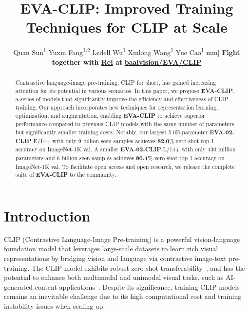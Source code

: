 \documentclass[10pt,twocolumn,letterpaper]{article}
\newcommand{\evablue}[1]{\textcolor{00blue!80}{#1}}
\newcommand{\evaclip}{{\textbf{\evablue{EVA-CLIP}}}\xspace}
\newcommand{\evaTwoclip}{{\textbf{\evablue{EVA-02-CLIP}}}\xspace}
\newcommand{\authorskip}{\hspace{4mm}}
\begin{document}
\title{\evaclip: Improved Training Techniques for CLIP at Scale}


\author{
{
Quan Sun\textsuperscript{1} \authorskip
Yuxin Fang\textsuperscript{1,2} \authorskip 
Ledell Wu\textsuperscript{1} \authorskip
Xinlong Wang\textsuperscript{1} \authorskip 
Yue Cao\textsuperscript{1}
}
\1mm]
{
\fontsize{8.4pt}{9.84pt}\selectfont
\textbf{Fight together with \href{https://en.wikipedia.org/wiki/Rei_Ayanami}{\color{00blue!80}Rei} at }\href{https://github.com/baaivision/EVA/tree/master/EVA-CLIP}{\color{00blue!80} \bfseries \ttfamily baaivision/EVA/CLIP}
}
}

\maketitle




\begin{abstract}
   Contrastive language-image pre-training, CLIP for short, has gained increasing attention for its potential in various scenarios. In this paper, we propose \evaclip, a series of models that significantly improve the efficiency and effectiveness of CLIP training. Our approach incorporates new techniques for representation learning, optimization, and augmentation, enabling \evaclip to achieve superior performance compared to previous CLIP models with the same number of parameters but significantly smaller training costs. Notably, our largest 5.0B-parameter \evaTwoclip-E/14+ with only 9 billion seen samples achieves \textbf{82.0}\% zero-shot top-1 accuracy on ImageNet-1K val. A smaller \evaTwoclip-L/14+ with only 430 million parameters and 6 billion seen samples achieves \textbf{80.4}\% zero-shot top-1 accuracy on ImageNet-1K val. To facilitate open access and open research, we release the complete suite of \evaclip to the community.
\end{abstract}





   

\section{Introduction}
CLIP (Contrastive Language-Image Pre-training) is a powerful vision-language foundation model that leverages large-scale datasets to learn rich visual representations by bridging vision and language via contrastive image-text pre-training. The CLIP model exhibits robust zero-shot transferability~\cite{clip}, and has the potential to enhance both multimodal and unimodal visual tasks, such as AI-generated content applications~\cite{dalle2,eva,blip2,laion5b}. Despite its significance, training CLIP models remains an inevitable challenge due to its high computational cost and training instability issues when scaling up. 
\end{document}
